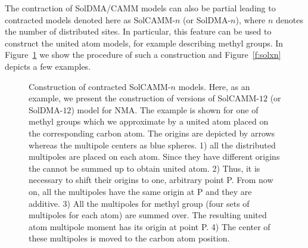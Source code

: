 \documentclass[a4paper,titlepage,twoside,fleqn,12pt]{book}
\begin{document}
\begin{refsection}
The contraction of SolDMA/CAMM models can also be partial
leading to contracted models denoted here as SolCAMM-$n$ (or SolDMA-$n$), where
$n$ denotes the number of distributed sites. In particular,
this feature can be used to construct the united atom models,
for example describing methyl groups. In Figure~\ref{f:contr}
we show the procedure of such a construction and Figure~\ref{f:solxn}
depicts a few examples.
%
\begin{figure}[!ht]
\centering
\setlength\fboxsep{0.4pt}
\setlength\fboxrule{0.5pt}
\caption{Construction of contracted SolCAMM-$n$ models. Here, as an example, we present
the construction of versions of SolCAMM-$12$ (or SolDMA-$12$) model for NMA. 
The example is shown for one of methyl groups which we approximate by a united atom 
placed on the corresponding carbon atom. The origins are depicted by arrows
whereas the multipole centers as blue spheres. 1) all the distributed multipoles 
are placed on each atom. Since they have different origins the cannot be summed up 
to obtain united atom. 2) Thus, it is necessary to shift their origins to one, 
arbitrary point P. From now on, all the multipoles have the same origin at P 
and they are additive. 3) All the multipoles for methyl group (four sets 
of multipoles for each atom) are summed over. The resulting united atom 
multipole moment has its origin at point P. 4) The center of these multipoles 
is moved to the carbon atom position.
\label{f:contr}}
\end{figure}
%


\end{refsection}
\end{document}
